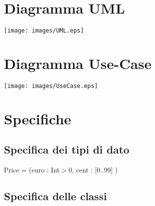 \documentclass[12pt, letterpaper]{article}
\begin{document}
\section{Diagramma UML}\begin{center}
    \texttt{[image: images/UML.eps]}
\end{center}
\newpage
\section{Diagramma Use-Case}\begin{center}
    \texttt{[image: images/UseCase.eps]}
\end{center}
\newpage
\section{Specifiche}
\subsection{Specifica dei tipi di dato}
Price = (euro : Int$>$0, cent : $[$0..99$]$ ) 
\subsection{Specifica delle classi}
\end{document}
